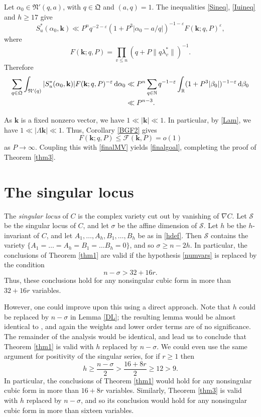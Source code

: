 \documentclass[12pt,reqno]{amsart}
\theoremstyle{definition}
\theoremstyle{remark}
\numberwithin{equation}{section}
\begin{document}
Let ${{\alpha}}_0 \in {\mathfrak N}'(q,a)$, with $q \in {\mathfrak Q}$ and $(a,q) = 1$. The inequalities \eqref{Sineq}, \eqref{Iuineq} and $h {\geqslant} 17$ give
\[
S_u^*({{\alpha}}_0, {\mathbf k}) \ll P^n q^{-2-{\varepsilon}} (1 + P^3|{{\alpha}}_0 - a/q|)^{-1-{\varepsilon}} F({\mathbf k}; q, P)^{\varepsilon},
\]
where
\[
 F({\mathbf k}; q, P) = \prod_{v {\leqslant} n} (q + P \| q {{\lambda}}^*_v \|)^{-1}.
\]
Therefore
\begin{align} \notag
\sum_{q \in {\mathfrak Q}} \int_{{\mathfrak N}'(q)} |S_u^*({{\alpha}}_0, {\mathbf k})| F({\mathbf k}; q,P)^{-{\varepsilon}} {{\,{\rm d}}} {{\alpha}}_0
&\ll P^n \sum_{q \in {\mathbb N}} q^{-1-{\varepsilon}} \int_{\mathbb R} (1+P^3 |{{\beta}}_0|)^{-1-{\varepsilon}} {{\,{\rm d}}} {{\beta}}_0
\\
\label{finalMV} &\ll P^{n-3}.
\end{align}

As ${\mathbf k}$ is a fixed nonzero vector, we have $1 \ll |{\mathbf k}| \ll 1$. In particular, by \eqref{Lam}, we have $1 \ll |{{\Lambda}} {\mathbf k}| \ll 1$. Thus, Corollary \ref{BGF2} gives
\[
F({\mathbf k}; q, P) {\leqslant} {\mathcal F}({\mathbf k}, P) = o(1)
\]
as $P \to \infty$. Coupling this with \eqref{finalMV} yields \eqref{finalgoal}, completing the proof of Theorem \ref{thm3}.

\section{The singular locus}
\label{nonsingular}

The \emph{singular locus} of $C$ is the complex variety cut out by vanishing of $\nabla C$. Let ${\mathcal S}$ be the singular locus of $C$, and let ${{\sigma}}$ be the affine dimension of ${\mathcal S}$. Let $h$ be the $h$-invariant of $C$, and let $A_1, \ldots, A_h, B_1, \ldots, B_h$ be as in \eqref{hdef}. Then ${\mathcal S}$ contains the variety $\{ A_1 = \ldots = A_h = B_1 = \ldots B_h = 0 \}$, and so ${{\sigma}} {\geqslant} n - 2h$. In particular, the conclusions of Theorem \ref{thm1} are valid if the hypothesis \eqref{numvars} is replaced by the condition
\[
n - {{\sigma}} > 32 + 16 r.
\]
Thus, these conclusions hold for any nonsingular cubic form in more than $32 + 16 r$ variables.

However, one could improve upon this using a direct approach. Note that $h$ could be replaced by $n - {{\sigma}}$ in Lemma \ref{DL}; the resulting lemma would be almost identical to \cite[Lemma 4.3]{Bir1962}, and again the weights and lower order terms are of no significance. The remainder of the analysis would be identical, and lead us to conclude that Theorem \ref{thm1} is valid with $h$ replaced by $n - {{\sigma}}$. We could even use the same argument for positivity of the singular series, for if $r {\geqslant} 1$ then
\[
h {\geqslant} \frac{n-{{\sigma}}}2 > \frac{16+8r}2 {\geqslant} 12 > 9.
\]
In particular, the conclusions of Theorem \ref{thm1} would hold for any nonsingular cubic form in more than $16 + 8 r$ variables. Similarly, Theorem \ref{thm3} is valid with $h$ replaced by $n - {{\sigma}}$, and so its conclusion would hold for any nonsingular cubic form in more than sixteen variables.
\end{document}
